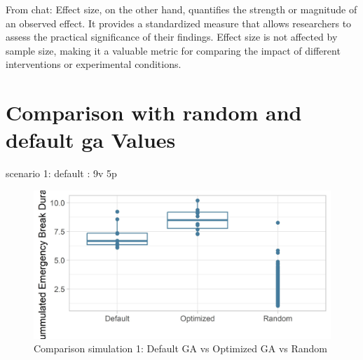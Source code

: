 From chat: 
Effect size, on the other hand, quantifies the strength or magnitude of an observed effect. It provides a standardized measure that allows researchers to assess the practical significance of their findings.
Effect size is not affected by sample size, making it a valuable metric for comparing the impact of different interventions or experimental conditions.

\section{Comparison with random and default ga Values}
scenario 1: default : 9v 5p
\begin{figure}[ht] 
	\label{figure:sim_1_comparison}
	\includegraphics[width=1\linewidth]{simulations/evaluation/plots/sim_1_comparison}
	\caption{Comparison simulation 1: Default GA vs Optimized GA vs Random}
\end{figure}


